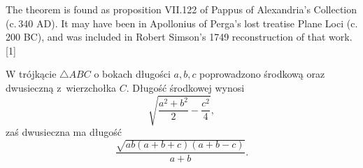 \begin{corollary}
	The theorem is found as proposition VII.122 of Pappus of Alexandria's Collection (c. 340 AD). It may have been in Apollonius of Perga's lost treatise Plane Loci (c. 200 BC), and was included in Robert Simson's 1749 reconstruction of that work.[1]
\end{corollary}

\begin{corollary}
	W trójkącie $\triangle ABC$ o bokach długości $a, b, c$ poprowadzono środkową oraz dwusieczną z~wierzchołka $C$.
	Długość środkowej wynosi
	\begin{equation}
		\sqrt{\frac{a^2 + b^2}{2} - \frac{c^2}{4}},
	\end{equation}
	zaś dwusieczna ma długość
	\begin{equation}
		\frac{\sqrt{ab (a+b+c)(a+b-c)}}{a+b}.
	\end{equation}
\end{corollary}